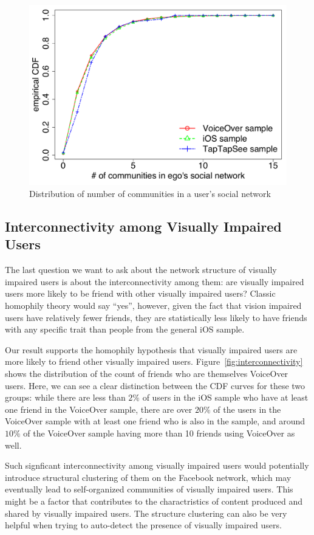 \documentclass{sigchi}
\begin{document}
\begin{figure}[htb]
\centering
\includegraphics[width=0.9\columnwidth]{community_count.pdf}
\caption{Distribution of number of communities in a user's social network }
\label{fig:community_count}
\end{figure}

\subsection{Interconnectivity among Visually Impaired Users}
The last question we want to ask about the network structure of visually impaired users is about the interconnectivity among them: are visually impaired users more likely to be friend with other visually impaired users? Classic homophily theory would say ``yes'', however, given the fact that vision impaired users have relatively fewer friends, they are statistically less likely to have friends with any specific trait than people from the general iOS sample.

Our result supports the homophily hypothesis that visually impaired users are more likely to friend other visually impaired users. Figure~\ref{fig:interconnectivity} shows the distribution of the count of friends who are themselves VoiceOver users. Here, we can see a clear distinction between the CDF curves for these two groups: while there are less than $2\%$ of users in the iOS sample who have at least one friend in the VoiceOver sample, there are over $20\%$ of the users in the VoiceOver sample with at least one friend who is also in the sample, and around $10\%$ of the VoiceOver sample having more than 10 friends using VoiceOver as well.
 
Such signficant interconnectivity among visually impaired users would potentially introduce structural clustering of them on the Facebook network, which may eventually lead to self-organized communities of visually impaired users. This might be a factor that contributes to the charactristics of content produced and shared by visually impaired users. The structure clustering can also be very helpful when trying to auto-detect the presence of visually impaired users.
\end{document}
